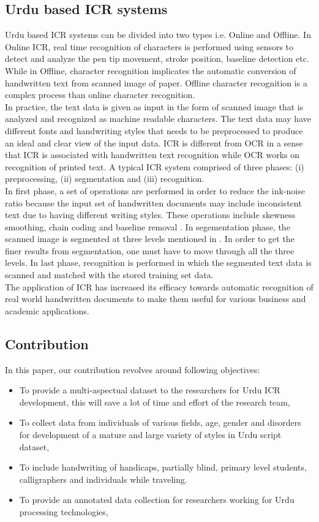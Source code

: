 \subsection{Urdu based ICR systems}
Urdu based ICR systems can be divided into two types i.e. Online and Offline. In Online ICR, real time recognition of characters is performed using sensors to detect and analyze the pen tip movement, stroke position, baseline detection etc. While in Offline, character recognition implicates the automatic conversion of handwritten text from scanned image of paper. Offline character recognition is a complex process than online character recognition\cite{8,9,10}. \\
In practice, the text data is given as input in the form of scanned image that is analyzed and recognized as machine readable characters. The text data may have different fonts and handwriting styles that needs to be preprocessed to produce an ideal and clear view of the input data. ICR is different from OCR in a sense that ICR is associated with handwritten text recognition while OCR works on recognition of printed text. A typical ICR system comprised of three phases: (i) preprocessing, (ii) segmentation and (iii) recognition.\\ 
In first phase, a set of operations are performed in order to reduce the ink-noise ratio because the input set of handwritten documents may include inconsistent text due to having different writing styles. These operations include skewness smoothing, chain coding and baseline removal \cite{5, 7}. In segementation phase, the scanned image is segmented at three levels mentioned in \cite{8,9}. In order to get the finer results from segmentation, one must have to move through all the three levels. In last phase, recognition is performed in which the segmented text data is scanned and matched with the stored training set data.\\ 
The application of ICR has increased its efficacy towards automatic recognition of real world handwritten documents to make them useful for various business and academic applications.

\subsection{Contribution}
In this paper, our contribution revolves around following objectives:
\begin{itemize}
\item To provide a multi-aspectual dataset to the researchers for Urdu ICR development, this will save a lot of time and effort of the research team,
\item To collect data from individuals of various fields, age, gender and disorders for development of a mature and large variety of styles in Urdu script dataset,
\item To include handwriting of handicaps, partially blind, primary level students, calligraphers and individuals while traveling.
\item To provide an annotated data collection for researchers working for Urdu processing technologies, 


\end{itemize}

